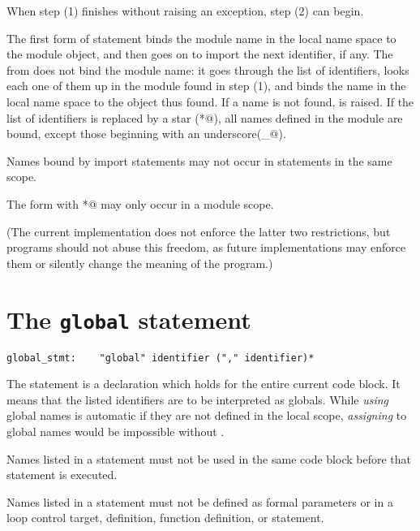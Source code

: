 When step (1) finishes without raising an exception, step (2) can
begin.

The first form of  statement binds the module name in the
local name space to the module object, and then goes on to import the
next identifier, if any.  The  from does not bind the
module name: it goes through the list of identifiers, looks each one
of them up in the module found in step (1), and binds the name in the
local name space to the object thus found.  If a name is not found,
 is raised.  If the list of identifiers is replaced
by a star (\verb@*@), all names defined in the module are bound,
except those beginning with an underscore(\verb@_@).

Names bound by import statements may not occur in 
statements in the same scope.

The  form with \verb@*@ may only occur in a module scope.

(The current implementation does not enforce the latter two
restrictions, but programs should not abuse this freedom, as future
implementations may enforce them or silently change the meaning of the
program.)

\section{The {\tt global} statement} \label{global}

\begin{verbatim}
global_stmt:    "global" identifier ("," identifier)*
\end{verbatim}

The  statement is a declaration which holds for the
entire current code block.  It means that the listed identifiers are to be
interpreted as globals.  While {\em using} global names is automatic
if they are not defined in the local scope, {\em assigning} to global
names would be impossible without .

Names listed in a  statement must not be used in the same
code block before that  statement is executed.

Names listed in a  statement must not be defined as formal
parameters or in a  loop control target, 
definition, function definition, or  statement.

